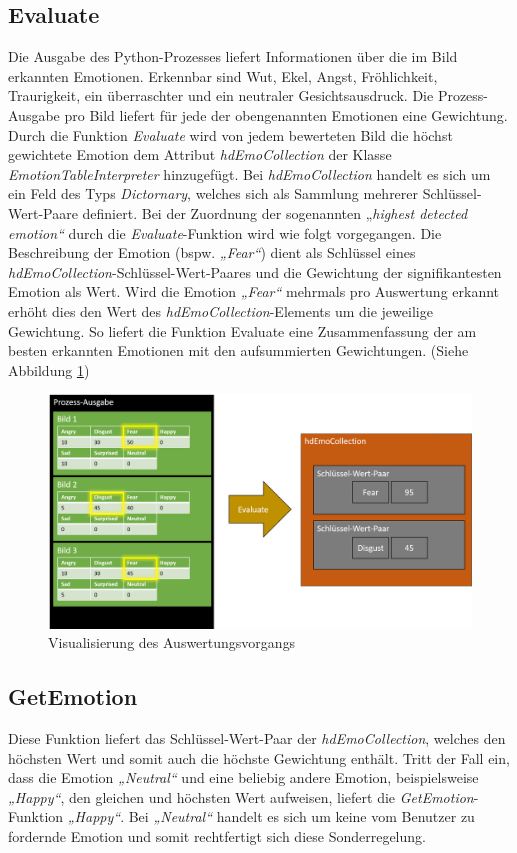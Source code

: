 \documentclass[10pt,a4paper]{report}
\begin{document}
\subsection{Evaluate}
Die Ausgabe des Python-Prozesses liefert Informationen über die im Bild erkannten Emotionen. Erkennbar sind Wut, Ekel, Angst, Fröhlichkeit, Traurigkeit, ein überraschter und ein neutraler Gesichtsausdruck. Die Prozess-Ausgabe pro Bild liefert für jede der obengenannten Emotionen eine Gewichtung. Durch die Funktion \textit{Evaluate} wird von jedem bewerteten Bild die höchst gewichtete Emotion dem Attribut \textit{hdEmoCollection} der Klasse \textit{EmotionTableInterpreter} hinzugefügt. Bei \textit{hdEmoCollection} handelt es sich um ein Feld des Typs \textit{Dictornary}, welches sich als Sammlung mehrerer Schlüssel-Wert-Paare definiert. Bei der Zuordnung der sogenannten „\textit{highest detected emotion“} durch die \textit{Evaluate}-Funktion wird wie folgt vorgegangen. Die Beschreibung der Emotion (bspw. \textit{„Fear“}) dient als Schlüssel eines \textit{hdEmoCollection}-Schlüssel-Wert-Paares und die Gewichtung der signifikantesten Emotion als Wert. Wird die Emotion \textit{„Fear“} mehrmals pro Auswertung erkannt erhöht dies den Wert des \textit{hdEmoCollection}-Elements um die jeweilige Gewichtung. So liefert die Funktion Evaluate eine Zusammenfassung der am besten erkannten Emotionen mit den aufsummierten Gewichtungen. (Siehe Abbildung \ref{fig:VisualisierungEvaluation})
 \begin{figure}
\includegraphics[scale=0.5]{Evaluate_Veranschaulichung.png}
 \caption{Visualisierung des Auswertungsvorgangs}
 \label{fig:VisualisierungEvaluation}
 \end{figure}
\subsection{GetEmotion}
Diese Funktion liefert das Schlüssel-Wert-Paar der \textit{hdEmoCollection}, welches den höchsten Wert und somit auch die höchste Gewichtung enthält. Tritt der Fall ein, dass die Emotion \textit{„Neutral“} und eine beliebig andere Emotion, beispielsweise \textit{„Happy“}, den gleichen und höchsten Wert aufweisen, liefert die \textit{GetEmotion}-Funktion \textit{„Happy“}. Bei \textit{„Neutral“} handelt es sich um keine vom Benutzer zu fordernde Emotion und somit rechtfertigt sich diese Sonderregelung.
\end{document}
